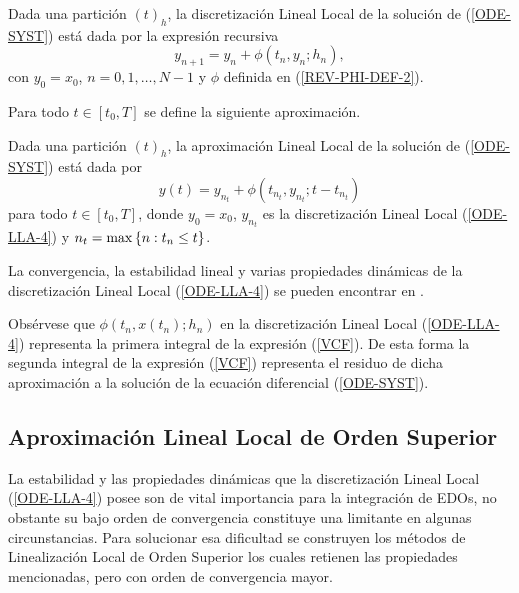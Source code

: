 \begin{definition}
	\label{definition LLD} Dada una partición $(t)_{h}$, la discretización Lineal Local de la solución de (\ref{ODE-SYST}) está dada por la expresión recursiva
	\begin{equation}
	y_{n+1}=y_{n}+\phi \left( t_{n},y_{n};h_{n}\right) ,  \label{ODE-LLA-4}
	\end{equation}%
	con $y_{0}=x_{0}$, $n=0,1,\ldots,N-1$ y $\phi$ definida en (\ref{REV-PHI-DEF-2}).
\end{definition}

Para todo $t\in[t_{0},T]$ se define la siguiente aproximación.
\begin{definition}
	\label{definition LLA} Dada una partición $(t)_{h}$, la aproximación
	Lineal Local de la solución de (\ref{ODE-SYST}) está dada por 
	\begin{equation}
	y(t)=y_{n_{t}}+\phi(t_{n_{t}},y_{n_{t}};t-t_{n_{t}})
	\label{ODE-REV-FORM-LLA}
	\end{equation}
	para todo $t\in[t_{0},T]$, donde $y_{0}=x_{0}$, $y_{n_{t}}$ es la discretización Lineal Local (\ref{ODE-LLA-4}) y ${n_{t}=\max\left\{ n:t_{n}\leq t \right\}}$.
\end{definition}

 La convergencia, la estabilidad lineal y varias propiedades dinámicas de  la discretización Lineal Local (\ref{ODE-LLA-4}) se pueden encontrar en \cite{Jimenez02AMC}. 
 
 Obsérvese que $\phi(t_{n},x(t_n);h_n)$ en la discretización Lineal Local (\ref{ODE-LLA-4}) representa la primera integral de la expresión (\ref{VCF}). De esta forma la segunda integral de la expresión (\ref{VCF}) representa el residuo de dicha aproximación a la solución de la ecuación diferencial (\ref{ODE-SYST}).
\subsection{Aproximación Lineal Local de Orden Superior}

La estabilidad y las propiedades dinámicas que la discretización Lineal Local (\ref{ODE-LLA-4}) posee son de vital importancia para la integración de EDOs, no obstante su bajo orden de convergencia constituye una limitante en algunas circunstancias. Para solucionar esa dificultad se construyen los métodos de Linealización Local de Orden Superior los cuales retienen las propiedades mencionadas, pero con orden de convergencia mayor. 

